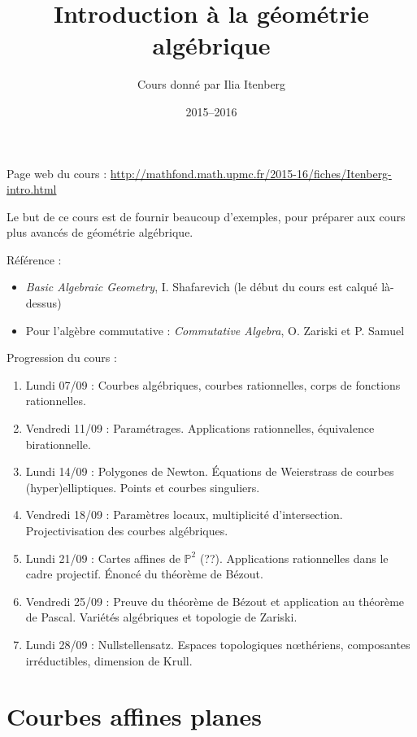 \documentclass[a4paper, 11pt]{article}
\theoremstyle{definition}
\newcommand{\proj}{\mathbb{P}}
\begin{document}
\title{Introduction à la géométrie algébrique}
\author{Cours donné par Ilia Itenberg}
\date{2015--2016}

\maketitle

Page web du cours : \url{http://mathfond.math.upmc.fr/2015-16/fiches/Itenberg-intro.html}

Le but de ce cours est de fournir beaucoup d'exemples, pour préparer
aux cours plus avancés de géométrie algébrique.

Référence :
\begin{itemize}
\item \textit{Basic Algebraic Geometry}, I. Shafarevich (le début du cours est calqué là-dessus)
\item Pour l'algèbre commutative : \textit{Commutative Algebra}, O. Zariski et P. Samuel
\end{itemize}

Progression du cours :
\begin{enumerate}
\item Lundi 07/09 : Courbes algébriques, courbes rationnelles, corps
  de fonctions rationnelles.
\item Vendredi 11/09 : Paramétrages. Applications rationnelles,
  équivalence birationnelle.
\item Lundi 14/09 : Polygones de Newton. Équations de Weierstrass de
  courbes (hyper)elliptiques. Points et courbes singuliers.
\item Vendredi 18/09 : Paramètres locaux, multiplicité
  d'intersection. Projectivisation des courbes algébriques.
\item Lundi 21/09 : Cartes affines de $\proj^2$ (??). Applications
  rationnelles dans le cadre projectif. Énoncé du théorème de Bézout.
\item Vendredi 25/09 : Preuve du théorème de Bézout et application au
  théorème de Pascal. Variétés algébriques et topologie de Zariski.
\item Lundi 28/09 : Nullstellensatz. Espaces topologiques nœthériens,
  composantes irréductibles, dimension de Krull.
\end{enumerate}

\tableofcontents

\newpage

\section{Courbes affines planes}
\end{document}
